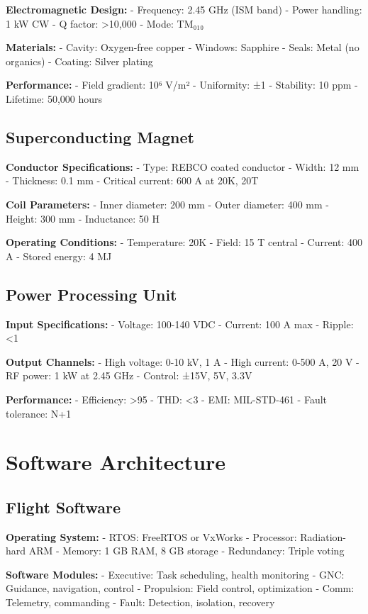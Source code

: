 \documentclass[12pt,letterpaper]{book}
\theoremstyle{definition}
\theoremstyle{plain}
\theoremstyle{remark}
\begin{document}
{{{{{\textbf{Electromagnetic Design:}
- Frequency: 2.45 GHz (ISM band)
- Power handling: 1 kW CW
- Q factor: >10,000
- Mode: TM₀₁₀

\textbf{Materials:}
- Cavity: Oxygen-free copper
- Windows: Sapphire
- Seals: Metal (no organics)
- Coating: Silver plating

\textbf{Performance:}
- Field gradient: 10⁶ V/m²
- Uniformity: ±1%
- Stability: 10 ppm
- Lifetime: 50,000 hours

\subsection{Superconducting Magnet}

\textbf{Conductor Specifications:}
- Type: REBCO coated conductor
- Width: 12 mm
- Thickness: 0.1 mm
- Critical current: 600 A at 20K, 20T

\textbf{Coil Parameters:}
- Inner diameter: 200 mm
- Outer diameter: 400 mm
- Height: 300 mm
- Inductance: 50 H

\textbf{Operating Conditions:}
- Temperature: 20K
- Field: 15 T central
- Current: 400 A
- Stored energy: 4 MJ

\subsection{Power Processing Unit}

\textbf{Input Specifications:}
- Voltage: 100-140 VDC
- Current: 100 A max
- Ripple: <1%

\textbf{Output Channels:}
- High voltage: 0-10 kV, 1 A
- High current: 0-500 A, 20 V
- RF power: 1 kW at 2.45 GHz
- Control: ±15V, 5V, 3.3V

\textbf{Performance:}
- Efficiency: >95%
- THD: <3%
- EMI: MIL-STD-461
- Fault tolerance: N+1

\section{Software Architecture}

\subsection{Flight Software}

\textbf{Operating System:}
- RTOS: FreeRTOS or VxWorks
- Processor: Radiation-hard ARM
- Memory: 1 GB RAM, 8 GB storage
- Redundancy: Triple voting

\textbf{Software Modules:}
- Executive: Task scheduling, health monitoring
- GNC: Guidance, navigation, control
- Propulsion: Field control, optimization
- Comm: Telemetry, commanding
- Fault: Detection, isolation, recovery

}}}}}
\end{document}
